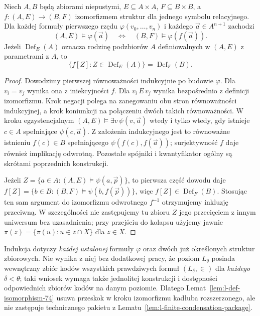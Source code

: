 \begin{lemat}
\label{lem:l-def-isomorphism-74}
Niech $A,B$ będą zbiorami niepustymi, $E\subseteq A\times A$,
$F\subseteq B\times B$, a $f:(A,E)\to(B,F)$ izomorfizmem
struktur dla jednego symbolu relacyjnego. Dla każdej formuły
pierwszego rzędu $\varphi(v_0,\ldots,v_n)$ i każdego
$\vec a\in A^{n+1}$ zachodzi
\[
 (A,E)\models\varphi(\vec a)
 \quad\Longleftrightarrow\quad
 (B,F)\models\varphi(f(\vec a)).
\]
Jeżeli $\operatorname{Def}_E(A)$ oznacza rodzinę podzbiorów
$A$ definiowalnych w $(A,E)$ z parametrami z $A$, to
\[
 \{f[Z]:Z\in\operatorname{Def}_E(A)\}
       =\operatorname{Def}_F(B).
\]
\end{lemat}
\begin{proof}
Dowodzimy pierwszej równoważności indukcyjnie po budowie
$\varphi$. Dla $v_i=v_j$ wynika ona z iniekcyjności $f$.
Dla $v_i\,E\,v_j$ wynika bezpośrednio z definicji
izomorfizmu. Krok negacji polega na zanegowaniu obu stron
równoważności indukcyjnej, a krok koniunkcji na połączeniu
dwóch takich równoważności. W kroku egzystencjalnym
$(A,E)\models\exists v\,\psi(v,\vec a)$ wtedy i tylko
wtedy, gdy istnieje $c\in A$ spełniające $\psi(c,\vec a)$.
Z założenia indukcyjnego jest to równoważne istnieniu
$f(c)\in B$ spełniającego $\psi(f(c),f(\vec a))$;
surjektywność $f$ daje również implikację odwrotną.
Pozostałe spójniki i kwantyfikator ogólny są skrótami
poprzednich konstrukcji.

Jeżeli $Z=\{a\in A:(A,E)\models\psi(a,\vec p)\}$,
to pierwsza część dowodu daje
$f[Z]=\{b\in B:(B,F)\models\psi(b,f(\vec p))\}$,
więc $f[Z]\in\operatorname{Def}_F(B)$. Stosując ten sam
argument do izomorfizmu odwrotnego $f^{-1}$ otrzymujemy
inkluzję przeciwną. W szczególności nie zastępujemy tu
zbioru $Z$ jego przecięciem z innym uniwersum bez
uzasadnienia; przy przejściu do kolapsu użyjemy jawnie
$\pi(z)=\{\pi(u):u\in z\cap X\}$ dla $z\in X$.
\end{proof}
\begin{uwaga}
\label{rem:l-isomorphism-fixed-vs-uniform-74}
Indukcja dotyczy \emph{każdej ustalonej} formuły
$\varphi$ oraz dwóch już określonych struktur zbiorowych.
Nie wynika z niej bez dodatkowej pracy, że poziom
$L_\theta$ posiada wewnętrzny zbiór kodów wszystkich
prawdziwych formuł $(L_\delta,\in)$ dla \emph{każdego}
$\delta<\theta$; taki wniosek wymaga także jednolitej
konstrukcji i dostępności odpowiednich zbiorów kodów
na danym poziomie. Dlatego Lemat~\ref{lem:l-def-isomorphism-74}
usuwa przeskok w kroku izomorfizmu kadłuba
rozszerzonego, ale nie zastępuje technicznego
pakietu z Lematu~\ref{lem:l-finite-condensation-package}.
\end{uwaga}


